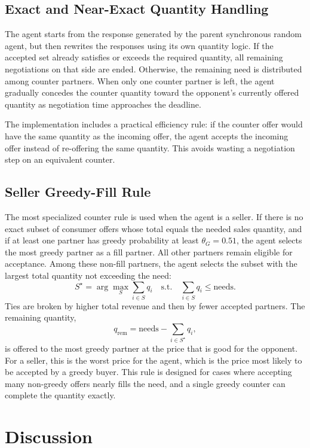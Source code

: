 \documentclass[11pt]{article}
\begin{document}
\subsection{Exact and Near-Exact Quantity Handling}

The agent starts from the response generated by the parent synchronous random
agent, but then rewrites the responses using its own quantity logic.  If the
accepted set already satisfies or exceeds the required quantity, all remaining
negotiations on that side are ended.  Otherwise, the remaining need is
distributed among counter partners.  When only one counter partner is left, the
agent gradually concedes the counter quantity toward the opponent's currently
offered quantity as negotiation time approaches the deadline.

The implementation includes a practical efficiency rule: if the counter offer
would have the same quantity as the incoming offer, the agent accepts the
incoming offer instead of re-offering the same quantity.  This avoids wasting a
negotiation step on an equivalent counter.

\subsection{Seller Greedy-Fill Rule}

The most specialized counter rule is used when the agent is a seller.  If there
is no exact subset of consumer offers whose total equals the needed sales
quantity, and if at least one partner has greedy probability at least
\(\theta_G = 0.51\), the agent selects the most greedy partner as a fill
partner.  All other partners remain eligible for acceptance.  Among these
non-fill partners, the agent selects the subset with the largest total quantity
not exceeding the need:
\[
  S^\star =
  \arg\max_{S}
  \sum_{i \in S} q_i
  \quad
  \text{s.t.}
  \quad
  \sum_{i \in S} q_i \le \text{needs}.
\]
Ties are broken by higher total revenue and then by fewer accepted partners.
The remaining quantity,
\[
  q_{\text{rem}} =
  \text{needs} - \sum_{i \in S^\star} q_i,
\]
is offered to the most greedy partner at the price that is good for the
opponent.  For a seller, this is the worst price for the agent, which is the
price most likely to be accepted by a greedy buyer.  This rule is designed for
cases where accepting many non-greedy offers nearly fills the need, and a
single greedy counter can complete the quantity exactly.

\section{Discussion}
\end{document}
